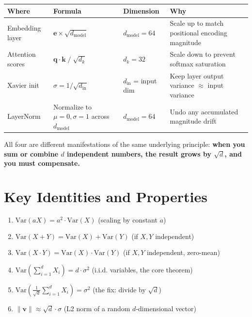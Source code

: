 \documentclass[11pt, a4paper]{article}
\begin{document}
\begin{center}
\begin{tabular}{p{3cm}p{3.5cm}p{3cm}p{3.5cm}}
\toprule
\textbf{Where} & \textbf{Formula} & \textbf{Dimension} & \textbf{Why} \\
\midrule
Embedding layer & $\bm{e} \times \sqrt{d_\text{model}}$ & $d_\text{model} = 64$ &
Scale up to match positional encoding magnitude \\[6pt]

Attention scores & $\bm{q} \cdot \bm{k} \;/\; \sqrt{d_k}$ & $d_k = 32$ &
Scale down to prevent softmax saturation \\[6pt]

Xavier init & $\sigma = 1 / \sqrt{d_\text{in}}$ & $d_\text{in}$ = input dim &
Keep layer output variance $\approx$ input variance \\[6pt]

LayerNorm & Normalize to $\mu=0, \sigma=1$ across $d_\text{model}$ & $d_\text{model} = 64$ &
Undo any accumulated magnitude drift \\
\bottomrule
\end{tabular}
\end{center}

All four are different manifestations of the same underlying principle:
\textbf{when you sum or combine $d$ independent numbers, the result grows by $\sqrt{d}$,
and you must compensate.}


\section{Key Identities and Properties}

\begin{enumerate}
\item $\text{Var}(aX) = a^2 \cdot \text{Var}(X)$ \quad (scaling by constant $a$)

\item $\text{Var}(X + Y) = \text{Var}(X) + \text{Var}(Y)$ \quad (if $X, Y$ independent)

\item $\text{Var}(X \cdot Y) = \text{Var}(X) \cdot \text{Var}(Y)$ \quad (if $X, Y$ independent, zero-mean)

\item $\text{Var}\!\left(\sum_{i=1}^{d} X_i\right) = d \cdot \sigma^2$ \quad (i.i.d. variables, the core theorem)

\item $\text{Var}\!\left(\frac{1}{\sqrt{d}} \sum_{i=1}^{d} X_i\right) = \sigma^2$ \quad (the fix: divide by $\sqrt{d}$)

\item $\|\bm{v}\| \approx \sqrt{d} \cdot \sigma$ \quad (L2 norm of a random $d$-dimensional vector)
\end{enumerate}
\end{document}
